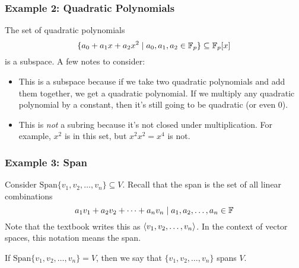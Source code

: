 \documentclass[letterpaper]{article}
\begin{document}
\subsubsection{Example 2: Quadratic Polynomials}
The set of quadratic polynomials 
\[\{a_0 + a_1 x + a_2 x^2 \mid a_0, a_1, a_2 \in \mathbb{F}_{p}\} \subseteq \mathbb{F}_{p}[x]\]
is a subspace. A few notes to consider:
\begin{itemize}
    \item This is a subspace because if we take two quadratic polynomials and add them together, we get a quadratic polynomial. If we multiply any quadratic polynomial by a constant, then it's still going to be quadratic (or even 0).
    \item This is \emph{not} a subring because it's not closed under multiplication. For example, $x^2$ is in this set, but $x^2 x^2 = x^4$ is not. 
\end{itemize}

\subsubsection{Example 3: Span}
Consider $\text{Span}\{v_1, v_2, \dots, v_n\} \subseteq V$. Recall that the span is the set of all linear combinations 
\[a_1 v_1 + a_2 v_2 + \dots + a_n v_n \mid a_1, a_2, \dots, a_n \in \mathbb{F}\]
Note that the textbook writes this as $\langle v_1, v_2, \dots, v_n \rangle$. In the context of vector spaces, this notation means the span. 

\bigskip 

If $\text{Span}\{v_1, v_2, \dots, v_n\} = V$, then we say that $\{v_1, v_2, \dots, v_n\}$ spans $V$. 
\end{document}
